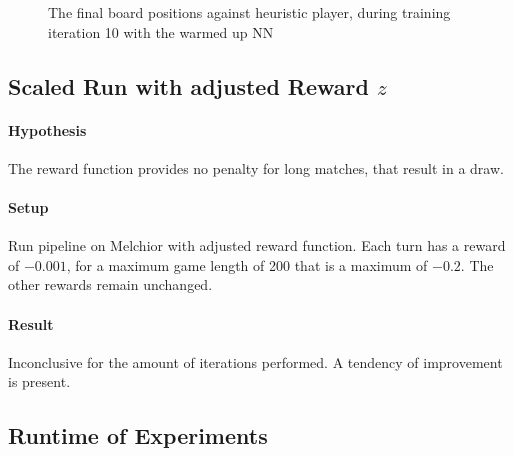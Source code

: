 \begin{figure}[!h]
    \centering
    \caption{The final board positions against heuristic player, during training iteration 10 with the warmed up NN}
    \label{performance_remote_warmed_up_heuristic}
\end{figure}

\subsection{Scaled Run with adjusted Reward $z$}
\paragraph{Hypothesis} The reward function provides no penalty for long matches, that result in a draw.
\paragraph{Setup} Run pipeline on Melchior with adjusted reward function. Each turn has a reward of $-0.001$, for a maximum game length of 200 that is a maximum of $-0.2$. The other rewards remain unchanged.

\paragraph{Result} Inconclusive for the amount of iterations performed. A tendency of improvement is present.
\begin{figure}[!h]
    \centering
    \hfill
    \caption{}
    \label{performance_remote_diff_z}
\end{figure}

\subsection{Runtime of Experiments}
